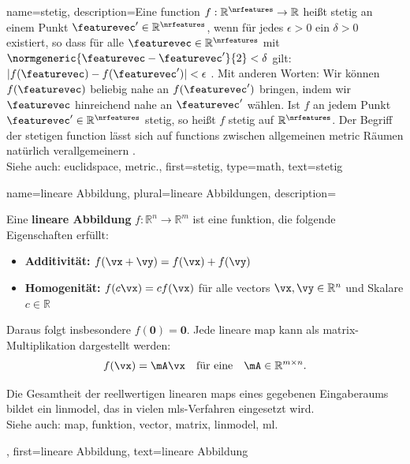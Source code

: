 {name={stetig}, 
description={Eine \gls{function} $f: \mathbb{R}^{\nrfeatures} \to \mathbb{R}$ heißt 
	stetig an einem Punkt $\featurevec' \in \mathbb{R}^{\nrfeatures}$, wenn für jedes 
	$\epsilon > 0$ ein $\delta > 0$ existiert, so dass für alle 
	$\featurevec \in \mathbb{R}^{\nrfeatures}$ mit 
	$\normgeneric{\featurevec - \featurevec'}{2} < \delta$ gilt: 
	$|f(\featurevec) - f(\featurevec')| < \epsilon$ \cite{RudinBookPrinciplesMatheAnalysis}. 
	Mit anderen Worten: Wir können $f(\featurevec)$ beliebig nahe an 
	$f(\featurevec')$ bringen, indem wir $\featurevec$ hinreichend nahe an 
	$\featurevec'$ wählen. Ist $f$ an jedem Punkt 
	$\featurevec' \in \mathbb{R}^{\nrfeatures}$ stetig, so heißt $f$ 
	stetig auf $\mathbb{R}^{\nrfeatures}$. 
	Der Begriff der stetigen \gls{function} lässt sich auf 
	\glspl{function} zwischen allgemeinen \gls{metric} Räumen 
	natürlich verallgemeinern \cite{RudinBookPrinciplesMatheAnalysis}.\\
		Siehe auch: \gls{euclidspace}, \gls{metric}.},
	first={stetig},
	type=math,
	text={stetig}
}


{name={lineare Abbildung}, plural={lineare Abbildungen},
 description={Eine \textbf{lineare Abbildung} $f: \mathbb{R}^n \rightarrow \mathbb{R}^m$ 
	ist eine \gls{funktion}, die folgende Eigenschaften erfüllt:
	\begin{itemize}
		\item \textbf{Additivität:} $f(\vx + \vy) = f(\vx) + f(\vy)$
		\item \textbf{Homogenität:} $f(c\vx) = c f(\vx)$ für alle \glspl{vector} $\vx, \vy \in \mathbb{R}^n$ 
		und Skalare $c \in \mathbb{R}$
	\end{itemize}
	Daraus folgt insbesondere $f(\mathbf{0}) = \mathbf{0}$.
	Jede lineare \gls{map} kann als \gls{matrix}-Multiplikation dargestellt werden: 
	$$f(\vx) = \mA \vx \quad \text{für eine} \quad \mA \in \mathbb{R}^{m \times n}.$$

	Die Gesamtheit der reellwertigen linearen \glspl{map} eines gegebenen Eingaberaums bildet ein 
	\gls{linmodel}, das in vielen \glspl{ml}-Verfahren eingesetzt wird.
	\\
	Siehe auch: \gls{map}, \gls{funktion}, \gls{vector}, \gls{matrix}, \gls{linmodel}, \gls{ml}.},
	first={lineare Abbildung},
	text={lineare Abbildung}
}

